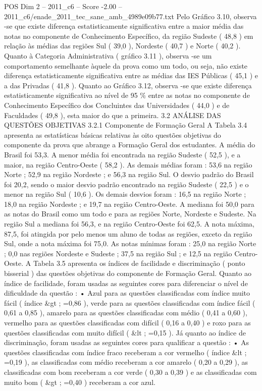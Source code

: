 \begin{textsample}{POS Dim 2 – 2011\_c6 – Score -2.00 – 2011\_c6/enade\_2011\_tec\_sane\_amb\_4989e09b77.txt}
Pelo Gráfico 3.10, observa -se que existe diferença estatisticamente significativa entre a maior média das notas no componente de Conhecimento Específico, da região Sudeste ( 48,8 ) em relação às médias das regiões Sul ( 39,0 ), Nordeste ( 40,7 ) e Norte ( 40,2 ).
Quanto à Categoria Administrativa ( gráfico 3.11 ), observa -se um comportamento semelhante àquele da prova como um todo, ou seja, não existe diferença estatisticamente significativa entre as médias das IES Públicas ( 45,1 ) e a das Privadas ( 41,8 ).
Quanto ao Gráfico 3.12, observa -se que existe diferença estatisticamente significativa ao nível de 95 \% entre as notas no componente de Conhecimento Específico dos Concluintes das Universidades ( 44,0 ) e de Faculdades ( 49,8 ), esta maior do que a primeira. 3.2 ANÁLISE DAS QUESTÕES OBJETIVAS 3.2.1 Componente de Formação Geral A Tabela 3.4 apresenta as estatísticas básicas relativas às oito questões objetivas do componente da prova que abrange a Formação Geral dos estudantes.
A média do Brasil foi 53,3.
A menor média foi encontrada na região Sudeste ( 52,5 ), e a maior, na região Centro-Oeste ( 58,2 ).
As demais médias foram : 53,6 na região Norte ; 52,9 na região Nordeste ; e 56,3 na região Sul.
O desvio padrão do Brasil foi 20,2, sendo o maior desvio padrão encontrado na região Sudeste ( 22,5 ) e o menor na região Sul ( 10,6 ).
Os demais desvios foram : 16,5 na região Norte ; 18,0 na região Nordeste ; e 19,7 na região Centro-Oeste.
A mediana foi 50,0 para as notas do Brasil como um todo e para as regiões Norte, Nordeste e Sudeste.
Na região Sul a mediana foi 56,3, e na região Centro-Oeste foi 62,5.
A nota máxima, 87,5, foi atingida por pelo menos um aluno de todas as regiões, exceto da região Sul, onde a nota máxima foi 75,0.
As notas mínimas foram : 25,0 na região Norte ; 0,0 nas regiões Nordeste e Sudeste ; 37,5 na região Sul ; e 12,5 na região Centro-Oeste.
A Tabela 3.5 apresenta os índices de facilidade e discriminação ( ponto bisserial ) das questões objetivas do componente de Formação Geral.
Quanto ao índice de facilidade, foram usadas as seguintes cores para diferenciar o nível de dificuldade da questão : • Azul para as questões classificadas com índice muito fácil ( índice \&gt ; =0,86 ), verde para as questões classificadas com índice fácil ( 0,61 a 0,85 ), amarelo para as questões classificadas com médio ( 0,41 a 0,60 ), vermelho para as questões classificadas com difícil ( 0,16 a 0,40 ) e roxo para as questões classificadas com muito difícil ( \&lt ; =0,15 ).
Já quanto ao índice de discriminação, foram usadas as seguintes cores para qualificar a questão : • As questões classificadas com índice fraco receberam a cor vermelho ( índice \&lt ; =0,19 ), as classificadas com médio receberam a cor amarelo ( 0,20 a 0,29 ), as classificadas com bom receberam a cor verde ( 0,30 a 0,39 ) e as classificadas com muito bom ( \&gt ; =0,40 ) receberam a cor azul.

\end{textsample}
